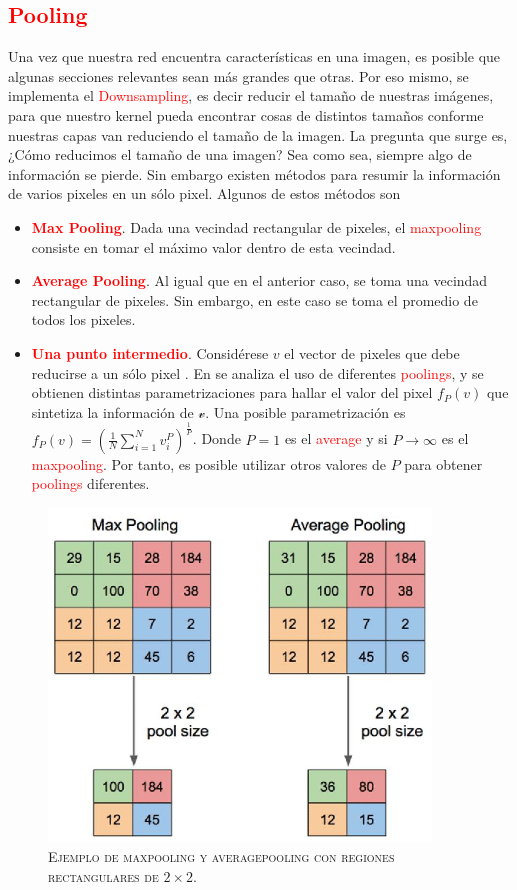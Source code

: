\subsection{\textcolor{red}{Pooling}}
Una vez que nuestra red encuentra características en una imagen, es posible que algunas secciones relevantes sean más grandes que otras. Por eso mismo, se implementa el \textcolor{red}{Downsampling}, es decir reducir el tamaño de nuestras imágenes, para que nuestro kernel pueda encontrar cosas de distintos tamaños conforme nuestras capas van reduciendo el tamaño de la imagen. La pregunta que surge es, ¿Cómo reducimos el tamaño de una imagen?  Sea como sea, siempre algo de información se pierde. Sin embargo existen métodos para resumir la información de varios pixeles en un sólo pixel. Algunos de estos métodos son
\begin{itemize}
    \item \textcolor{red}{\textbf{Max Pooling}}. Dada una vecindad rectangular de pixeles, el \textcolor{red}{maxpooling} consiste en tomar el máximo valor dentro de esta vecindad. 
    \item \textcolor{red}{\textbf{Average Pooling}}. Al igual que en el anterior caso, se toma una vecindad rectangular de pixeles. Sin embargo, en este caso se toma el promedio de todos los pixeles.
    \item \textcolor{red}{\textbf{Una punto intermedio}}. Considérese $v$ el vector de pixeles que debe reducirse a un sólo pixel . En \cite{pooling_analysis} se analiza el uso de diferentes \textcolor{red}{poolings}, y se obtienen distintas parametrizaciones para hallar el valor del pixel $f_P(v)$ que sintetiza la información de $\mathcal v$. Una posible parametrización es $f_P(v) = \left(\frac{1}{N}\sum_{i= 1}^{N}v_i^P\right)^{\frac{1}{P}}$. Donde $P=1$ es el \textcolor{red}{average} y si $P\to \infty$ es el \textcolor{red}{maxpooling}. Por tanto, es posible utilizar otros valores de $P$ para obtener \textcolor{red}{poolings} diferentes.
\end{itemize}
\begin{figure}[H]
    \centering
    \includegraphics[width=4in]{../cap2_CNNs/src/pooling.png}
    \caption{\textsc{Ejemplo de maxpooling y averagepooling con regiones rectangulares de $2\times 2$.}} 
\end{figure}
